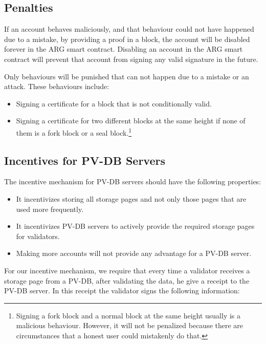 \subsection{Penalties}\label{subsec:penalties}

If an account behaves maliciously, and that behaviour could not have happened due to a mistake, by providing a proof
in a block, the account will be disabled forever in the ARG smart contract. Disabling an account in the
ARG smart contract will prevent that account from signing any valid signature in the future.

Only behaviours will be punished that can not happen due to a mistake or an attack. These behaviours include:
\begin{itemize}
    \item Signing a certificate for a block that is not conditionally valid.
    \item Signing a certificate for two different blocks at the same height if none of them
    is a fork block or a seal block.\footnote{Signing
    a fork block and a normal block at the same height usually is a malicious behaviour. However, it will not be
    penalized because there are circumstances that a honest user could mistakenly do that.}
\end{itemize}

\subsection{Incentives for PV-DB Servers}\label{subsec:PV-DB-servers}

The incentive mechanism for PV-DB servers should have the following properties:

\begin{itemize}
    \item It incentivizes storing all storage pages and not only those pages that are used more frequently.
    \item It incentivizes PV-DB servers to actively provide the required storage pages for validators.
    \item Making more accounts will not provide any advantage for a PV-DB server.
\end{itemize}

For our incentive mechanism, we require that every time a validator receives a storage page from a PV-DB, after
validating the data, he give a receipt to the PV-DB server. In this receipt the validator signs the
following information:


